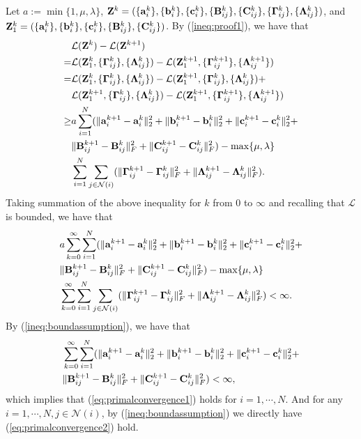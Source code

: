 \documentclass[journal]{IEEEtran}
\newcommand{\B}{{\bf B}}
\newcommand{\C}{{\bf C}}
\newcommand{\bZ}{{\bf Z}}
\begin{document}
{Let $a := \min\{1, \mu, \lambda\}$, $\bZ^k = (\{{\bf a}_i^k\}, \{{\bf b}_i^k\}, \{{\bf c}_i^k\}, \{\B_{ij}^k\}, \{\C_{ij}^k\}, \{{\bf{\Gamma}}_{ij}^k\}, \{{\bf{\Lambda}}_{ij}^k\})$, and $\bZ_1^k = (\{{\bf a}_i^k\}, \{{\bf b}_i^k\}, \{{\bf c}_i^k\}, \{\B_{ij}^k\}, \{\C_{ij}^k\})$.  By (\ref{ineq:proof1}), we have that 
\begin{align*}
    &\mathcal{L}(\bZ^k) - \mathcal{L}(\bZ^{k+1})\\
    =&\mathcal{L}(\bZ_1^k, \{{\bf{\Gamma}}_{ij}^k\}, \{{\bf{\Lambda}}_{ij}^k\})-\mathcal{L}(\bZ_1^{k+1}, \{{\bf{\Gamma}}_{ij}^{k+1}\}, \{{\bf{\Lambda}}_{ij}^{k+1}\})\\
    =&\mathcal{L}(\bZ_1^k, \{{\bf{\Gamma}}_{ij}^k\}, \{{\bf{\Lambda}}_{ij}^k\})-
    \mathcal{L}(\bZ_1^{k+1}, \{{\bf{\Gamma}}_{ij}^{k}\}, \{{\bf{\Lambda}}_{ij}^{k}\})+\\
    &\mathcal{L}(\bZ_1^{k+1}, \{{\bf{\Gamma}}_{ij}^{k}\}, \{{\bf{\Lambda}}_{ij}^{k}\})-\mathcal{L}(\bZ_1^{k+1}, \{{\bf{\Gamma}}_{ij}^{k+1}\}, \{{\bf{\Lambda}}_{ij}^{k+1}\})\\
    \geq & a\sum\limits_{i=1}^N(\|{\bf a}_i^{k+1}-{\bf a}_i^{k}\|_2^2+\|{\bf b}_i^{k+1}-{\bf b}_i^{k}\|_2^2+\|{\bf c}_i^{k+1}-{\bf c}_i^{k}\|_2^2+\\
    &\|\B_{ij}^{k+1}-\B_{ij}^{k}\|_F^2+\|\C_{ij}^{k+1}-\C_{ij}^{k}\|_F^2)-\max\{\mu, \lambda\}\\
    &\sum\limits_{i=1}^N\sum\limits_{j\in\mathcal{N}(i)}(\|{\bf{\Gamma}}_{ij}^{k+1}-{\bf{\Gamma}}_{ij}^{k}\|_F^2+\|{\bf{\Lambda}}_{ij}^{k+1}-{\bf{\Lambda}}_{ij}^{k}\|_F^2).
\end{align*}
Taking summation of the above inequality for $k$ from 0 to $\infty$ and recalling that $\mathcal{L}$ is bounded, we have that  
\begin{align*}
    &a\sum\limits_{k=0}^{\infty}\sum\limits_{i=1}^N(\|{\bf a}_i^{k+1}-{\bf a}_i^{k}\|_2^2+\|{\bf b}_i^{k+1}-{\bf b}_i^{k}\|_2^2+\|{\bf c}_i^{k+1}-{\bf c}_i^{k}\|_2^2+\\
    &\|\B_{ij}^{k+1}-\B_{ij}^{k}\|_F^2+\|\C_{ij}^{k+1}-\C_{ij}^{k}\|_F^2)-\max\{\mu, \lambda\}\\
    &\sum\limits_{k=0}^{\infty}\sum\limits_{i=1}^N\sum\limits_{j\in\mathcal{N}(i)}(\|{\bf{\Gamma}}_{ij}^{k+1}-{\bf{\Gamma}}_{ij}^{k}\|_F^2+\|{\bf{\Lambda}}_{ij}^{k+1}-{\bf{\Lambda}}_{ij}^{k}\|_F^2)<\infty.
\end{align*}
By (\ref{ineq:boundassumption}), we have that 
\begin{align*}
    &\sum\limits_{k=0}^{\infty}\sum\limits_{i=1}^N(\|{\bf a}_i^{k+1}-{\bf a}_i^{k}\|_2^2+\|{\bf b}_i^{k+1}-{\bf b}_i^{k}\|_2^2+\|{\bf c}_i^{k+1}-{\bf c}_i^{k}\|_2^2+\\
    &\|\B_{ij}^{k+1}-\B_{ij}^{k}\|_F^2+\|\C_{ij}^{k+1}-\C_{ij}^{k}\|_F^2)<\infty,
\end{align*}
which implies that (\ref{eq:primalconvergence1}) holds for $i=1,\cdots, N$. And for any $i=1,\cdots, N, j\in\mathcal{N}(i)$, by  (\ref{ineq:boundassumption}) we directly have (\ref{eq:primalconvergence2}) hold.
} 
\end{document}
